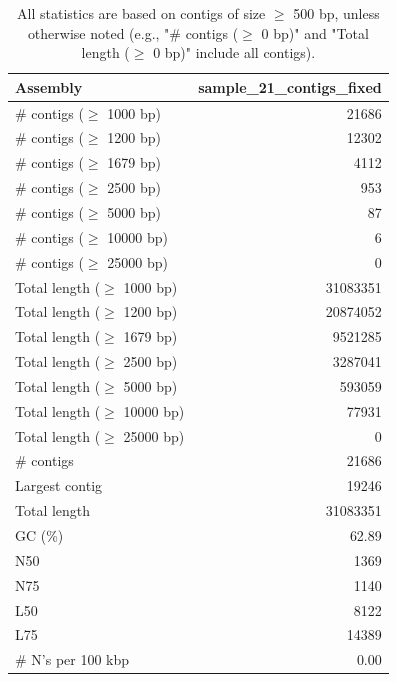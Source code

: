 \documentclass[12pt,a4paper]{article}
\begin{document}
\begin{table}[ht]
\begin{center}
\caption{All statistics are based on contigs of size $\geq$ 500 bp, unless otherwise noted (e.g., "\# contigs ($\geq$ 0 bp)" and "Total length ($\geq$ 0 bp)" include all contigs).}
\begin{tabular}{|l*{1}{|r}|}
\hline
Assembly & sample\_21\_contigs\_fixed \\ \hline
\# contigs ($\geq$ 1000 bp) & 21686 \\ \hline
\# contigs ($\geq$ 1200 bp) & 12302 \\ \hline
\# contigs ($\geq$ 1679 bp) & 4112 \\ \hline
\# contigs ($\geq$ 2500 bp) & 953 \\ \hline
\# contigs ($\geq$ 5000 bp) & 87 \\ \hline
\# contigs ($\geq$ 10000 bp) & 6 \\ \hline
\# contigs ($\geq$ 25000 bp) & 0 \\ \hline
Total length ($\geq$ 1000 bp) & 31083351 \\ \hline
Total length ($\geq$ 1200 bp) & 20874052 \\ \hline
Total length ($\geq$ 1679 bp) & 9521285 \\ \hline
Total length ($\geq$ 2500 bp) & 3287041 \\ \hline
Total length ($\geq$ 5000 bp) & 593059 \\ \hline
Total length ($\geq$ 10000 bp) & 77931 \\ \hline
Total length ($\geq$ 25000 bp) & 0 \\ \hline
\# contigs & 21686 \\ \hline
Largest contig & 19246 \\ \hline
Total length & 31083351 \\ \hline
GC (\%) & 62.89 \\ \hline
N50 & 1369 \\ \hline
N75 & 1140 \\ \hline
L50 & 8122 \\ \hline
L75 & 14389 \\ \hline
\# N's per 100 kbp & 0.00 \\ \hline
\end{tabular}
\end{center}
\end{table}
\end{document}
